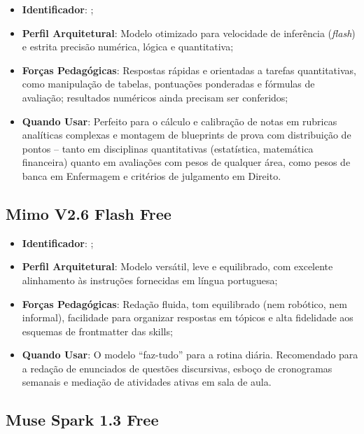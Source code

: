 \begin{itemize}
  \item \textbf{Identificador}: ;
  \item \textbf{Perfil Arquitetural}: Modelo otimizado para velocidade de infer{\^e}ncia (\emph{flash}) e estrita precis{\~a}o num{\'e}rica, l{\'o}gica e quantitativa;
   \item \textbf{For{\c c}as Pedag{\'o}gicas}: Respostas r{\'a}pidas e orientadas a tarefas quantitativas, como manipula{\c c}{\~a}o de tabelas, pontua{\c c}{\~o}es ponderadas e f{\'o}rmulas de avalia{\c c}{\~a}o; resultados num{\'e}ricos ainda precisam ser conferidos;
   \item \textbf{Quando Usar}: Perfeito para o c{\'a}lculo e calibra{\c c}{\~a}o de notas em rubricas anal{\'i}ticas complexas e montagem de blueprints de prova com distribui{\c c}{\~a}o de pontos -- tanto em disciplinas quantitativas (estat{\'i}stica, matem{\'a}tica financeira) quanto em avalia{\c c}{\~o}es com pesos de qualquer {\'a}rea, como pesos de banca em Enfermagem e crit{\'e}rios de julgamento em Direito.
\end{itemize}

\subsection{Mimo V2.6 Flash Free}

\begin{itemize}
  \item \textbf{Identificador}: ;
  \item \textbf{Perfil Arquitetural}: Modelo vers{\'a}til, leve e equilibrado, com excelente alinhamento {\`a}s instru{\c c}{\~o}es fornecidas em l{\'i}ngua portuguesa;
  \item \textbf{For{\c c}as Pedag{\'o}gicas}: Reda{\c c}{\~a}o fluida, tom equilibrado (nem rob{\'o}tico, nem informal), facilidade para organizar respostas em t{\'o}picos e alta fidelidade aos esquemas de frontmatter das skills;
  \item \textbf{Quando Usar}: O modelo ``faz-tudo'' para a rotina di{\'a}ria. Recomendado para a reda{\c c}{\~a}o de enunciados de quest{\~o}es discursivas, esbo{\c c}o de cronogramas semanais e media{\c c}{\~a}o de atividades ativas em sala de aula.
\end{itemize}

\subsection{Muse Spark 1.3 Free}

